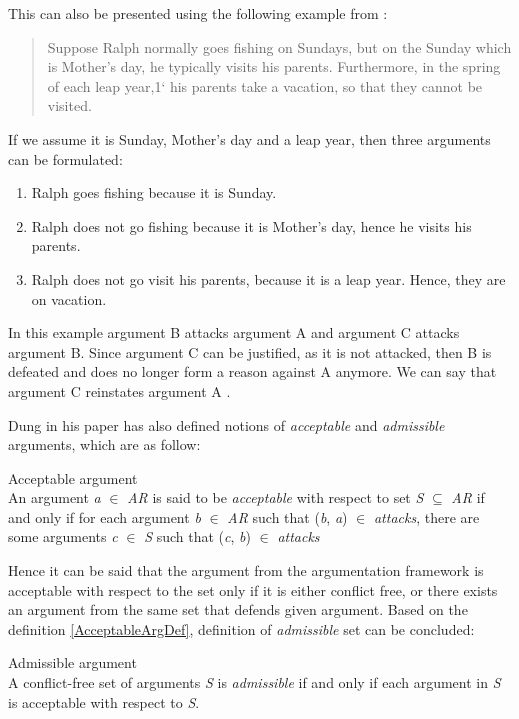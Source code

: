 This can also be presented using the following example from \citet{konolige1988defeasible}:
\begin{quote}
Suppose Ralph normally goes fishing on Sundays, but on the Sunday which is
Mother’s day, he typically visits his parents. Furthermore, in the spring of each
leap year,1` his parents take a vacation, so that they cannot be visited.
\end{quote}
If we assume it is Sunday, Mother's day and a leap year, then three arguments can be formulated:
\begin{enumerate}[label=\Alph*]
	\item{Ralph goes fishing because it is Sunday.}
	\item{Ralph does not go fishing because it is Mother's day, hence he visits his parents.}
	\item{Ralph does not go visit his parents, because it is a leap year. Hence, they are on vacation.}
\end{enumerate}
In this example argument B attacks argument A and argument C attacks argument B. Since argument C can be justified, as it is not attacked, then B is defeated and does no longer form a reason against A anymore. We can say that argument C reinstates argument A \citep{caminada2004sake}.


Dung in his paper \citep{dung1995} has also defined notions of \textit{acceptable} and \textit{admissible} arguments, which are as follow:

\begin{definition}{Acceptable argument}
\label{AcceptableArgDef}\\
An argument \textit{a} $\in$ \textit{AR} is said to be \textit{acceptable} with respect to set \textit{S} $\subseteq$ \textit{AR} if and only if for each argument \textit{b} $\in$ \textit{AR} such that (\textit{b}, \textit{a}) $\in$ \textit{attacks}, there are some arguments \textit{c} $\in$ \textit{S} such that (\textit{c}, \textit{b}) $\in$ \textit{attacks}
\end{definition}

Hence it can be said that the argument from the argumentation framework is acceptable with respect to the set only if it is either conflict free, or there exists an argument from the same set that defends given argument. Based on the definition \ref{AcceptableArgDef}, definition of \textit{admissible} set can be concluded:

\begin{definition}{Admissible argument}
\label{AdmissibleArgDef}\\
A conflict-free set of arguments \textit{S} is \textit{admissible} if and only if each argument in \textit{S} is acceptable with respect to \textit{S}.
\end{definition}

